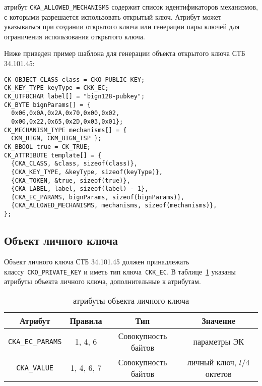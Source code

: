 
 атрибут \verb|CKA_ALLOWED_MECHANISMS| содержит список 
идентификаторов механизмов, с которыми разрешается использовать
открытый ключ. Атрибут может указываться при создании открытого
ключа или генерации пары ключей для ограничения использования
открытого ключа. 
 

Ниже приведен пример шаблона для генерации объекта открытого ключа СТБ 34.101.45:
\begin{verbatim}
CK_OBJECT_CLASS class = CKO_PUBLIC_KEY;
CK_KEY_TYPE keyType = CKK_EC;
CK_UTF8CHAR label[] = "bign128-pubkey";
CK_BYTE bignParams[] = {
  0x06,0x0A,0x2A,0x70,0x00,0x02,
  0x00,0x22,0x65,0x2D,0x03,0x01};
CK_MECHANISM_TYPE mechanisms[] = {
  CKM_BIGN, CKM_BIGN_TSP };
CK_BBOOL true = CK_TRUE;
CK_ATTRIBUTE template[] = {
  {CKA_CLASS, &class, sizeof(class)},
  {CKA_KEY_TYPE, &keyType, sizeof(keyType)},
  {CKA_TOKEN, &true, sizeof(true)},
  {CKA_LABEL, label, sizeof(label) - 1},
  {CKA_EC_PARAMS, bignParams, sizeof(bignParams)},
  {CKA_ALLOWED_MECHANISMS, mechanisms, sizeof(mechanisms)},
};
\end{verbatim}




\subsection{Объект личного ключа}


Объект личного ключа СТБ 34.101.45 должен принадлежать
классу~\verb|CKO_PRIVATE_KEY| и иметь тип ключа~\verb|CKK_EC|.
В таблице~\ref{Table.CRYPTOKI.EcPrivkeyAttrs} указаны 
 атрибуты объекта личного ключа, дополнительные к 
 атрибутам.

\begin{table}[H]
\caption{ атрибуты объекта личного 
ключа}\label{Table.CRYPTOKI.EcPrivkeyAttrs}
\begin{tabular}{|c|c|c|c|}
\hline
Атрибут & Правила & Тип & Значение\\
\hline
\hline
\verb|CKA_EC_PARAMS| & 1, 4, 6 & Совокупность байтов &
параметры ЭК\\
\hline
\verb|CKA_VALUE| & 1, 4, 6, 7 & Совокупность байтов &
личный ключ, $l/4$ октетов\\
\hline
\end{tabular}
\end{table}

